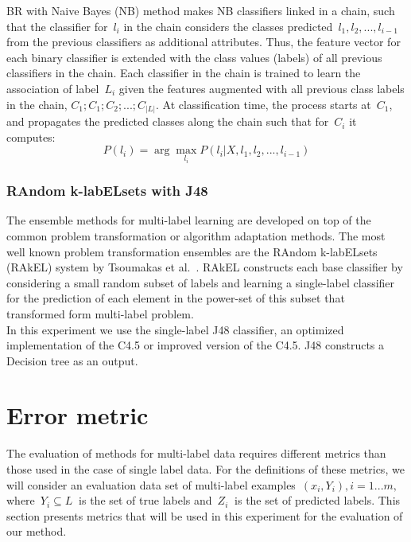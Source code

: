 \documentclass[runningheads,a4paper]{llncs}
\begin{document}
BR with Naive Bayes (NB) method makes NB classifiers linked in a chain, such that the classifier for~$l_{i}$ in the chain considers the classes predicted~$l_1,l_2,...,l_{i-1}$ from the previous classifiers as additional attributes. Thus, the feature vector for each binary classifier is extended with the class values (labels) of all previous classifiers in the chain. Each classifier in the chain is trained to learn the association of label~$L_i$
given the features augmented with all previous class labels in the chain, $ C_1;C_1;C_2;...;C_{|L|}$. At classification time, the process starts at~$C_1$, and propagates the predicted classes along   the   chain   such   that   for~$C_i$ it   computes: 
\begin{equation}
P(l_i)= \arg \max_{l_i} P(l_i|X,l_1,l_2,...,l_{i-1}) 
\end{equation}

\subsubsection{RAndom k-labELsets with J48}
The ensemble methods for multi-label learning are developed on top of the common problem transformation or algorithm adaptation methods. The most well known problem transformation ensembles are the RAndom k-labELsets (RAkEL) system by Tsoumakas et al.~\cite{Tsoumakas2011random}. RAkEL constructs each base classifier by considering a small random subset of labels and learning a single-label classifier for the prediction of each element in the power-set of this subset that transformed form multi-label problem. \\

In this experiment we use the single-label J48 classifier, an optimized  implementation of the  C4.5 or improved version of the  C4.5. J48 constructs a Decision tree as an output.  

\section{Error metric}\label{sec:eval-meas-princ}

The evaluation of methods for multi-label data requires different metrics than those used in the case of single label data. For the definitions of these metrics, we will consider an evaluation data set of multi-label examples~$(x_i ,Y_i ), i = 1...m, $ where~$ Y_i \subseteq L~$ is the set of true labels and~$ Z_i~$ is the set of predicted labels. This section presents metrics \cite{Tsoumakas2010MLD} that will be used in this experiment for the evaluation of our method. 
\end{document}
